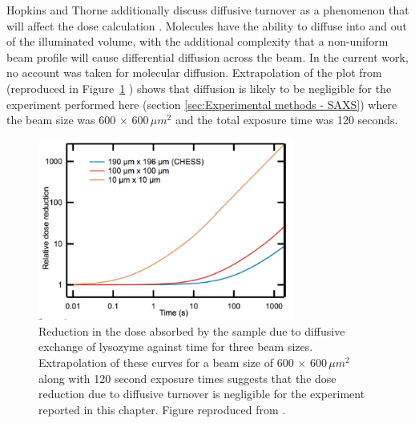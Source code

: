 Hopkins and Thorne additionally discuss diffusive turnover as a phenomenon that will affect the dose calculation \cite{hopkins2016quantifying}.
Molecules have the ability to diffuse into and out of the illuminated volume, with the additional complexity that a non-uniform beam profile will cause differential diffusion across the beam.
In the current work, no account was taken for molecular diffusion.
Extrapolation of the plot from \cite{hopkins2016quantifying} (reproduced in Figure~\ref{fig:Diffusive turnover effect} ) shows that diffusion is likely to be negligible for the experiment performed here (section \ref{sec:Experimental methods - SAXS}) where the beam size was 600 $\times$ 600$\,\mu m^{\text{2}}$ and the total exposure time was 120 seconds.
\begin{figure}
    \centering
    \includegraphics[width=0.75\textwidth]{figures/saxs/diffusive_turnover_effect.png}
    \caption[Effect of diffusive turnover on the dose in SAXS.]{Reduction in the dose absorbed by the sample due to diffusive exchange of lysozyme against time for three beam sizes.
    Extrapolation of these curves for a beam size of 600 $\times$ 600$\,\mu m^{\text{2}}$ along with 120 second exposure times suggests that the dose reduction due to diffusive turnover is negligible for the experiment reported in this chapter.
    Figure reproduced from \cite{hopkins2016quantifying}.}
    \label{fig:Diffusive turnover effect}
\end{figure}

